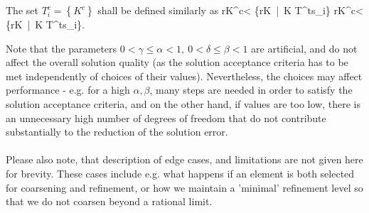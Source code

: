 The set $T^{c}_i = \left\{K^{c}\right\}$ shall be defined similarly as
\be
	r\lo K^{c}\ro < \gamma \cdot \max\left\{r\lo K\ro\ |\ K \in T^{ts}_i\right\} 
\ee
\be
	\label{refIndicatorValuesEnd}
	r\lo K^{c}\ro < \delta \cdot \sum\left\{r\lo K\ro\ |\ K \in T^{ts}_i\right\}.
\ee

Note that the parameters $0 < \gamma \leq \alpha < 1,\ 0 < \delta \leq \beta < 1$ are artificial, and do not affect the overall solution quality (as the solution acceptance criteria has to be met independently of choices of their values). Nevertheless, the choices may affect performance - e.g. for a high $\alpha, \beta$, many steps are needed in order to satisfy the solution acceptance criteria, and on the other hand, if values are too low, there is an unnecessary high number of degrees of freedom that do not contribute substantially to the reduction of the solution error.
\paragraph{}
Please also note, that description of edge cases, and limitations are not given here for brevity. These cases include e.g. what happens if an element is both selected for coarsening and refinement, or how we maintain a 'minimal' refinement level so that we do not coarsen beyond a rational limit.
